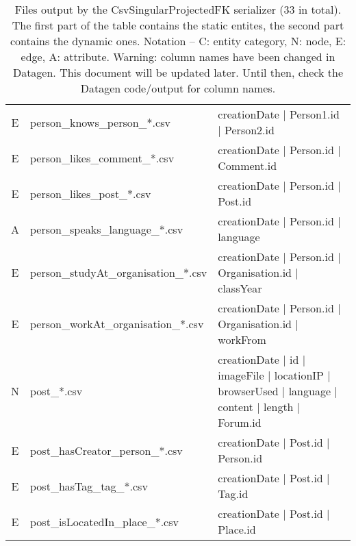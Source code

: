 \begin{table}[htb]
\begin{tabular}{|c|l|l|}
        E                    & person\_knows\_person\_*.csv            & creationDate | Person1.id | Person2.id                                                            \\
        E                    & person\_likes\_comment\_*.csv           & creationDate | Person.id | Comment.id                                                             \\
        E                    & person\_likes\_post\_*.csv              & creationDate | Person.id | Post.id                                                                \\
        A                    & person\_speaks\_language\_*.csv         & creationDate | Person.id | language                                                               \\
        E                    & person\_studyAt\_organisation\_*.csv    & creationDate | Person.id | Organisation.id | classYear                                            \\
        E                    & person\_workAt\_organisation\_*.csv     & creationDate | Person.id | Organisation.id | workFrom                                             \\
        \hline
        N                    & post\_*.csv                             & creationDate | id | imageFile | locationIP | browserUsed | language | content | length | Forum.id \\
        E                    & post\_hasCreator\_person\_*.csv         & creationDate | Post.id | Person.id                                                                \\
        E                    & post\_hasTag\_tag\_*.csv                & creationDate | Post.id | Tag.id                                                                   \\
        E                    & post\_isLocatedIn\_place\_*.csv         & creationDate | Post.id | Place.id                                                                 \\
        \hline
    \end{tabular}
    \caption{Files output by the CsvSingularProjectedFK serializer (33 in total). The first part of the table contains the static entites, the second part contains the dynamic ones. Notation -- C: entity category, N: node, E: edge, A: attribute. Warning: column names have been changed in Datagen. This document will be updated later. Until then, check the Datagen code/output for column names.}
    \label{table:csv-singular-projectedfk}
\end{table}
